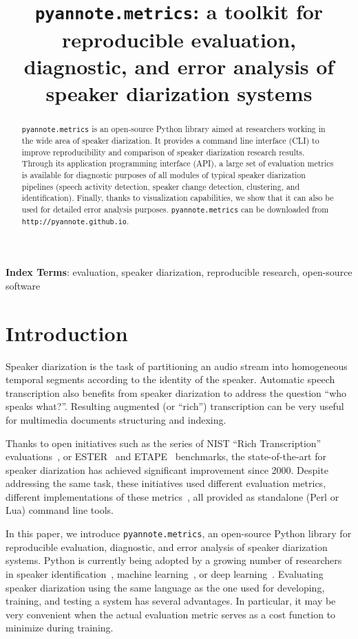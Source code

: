 \documentclass[a4paper]{article}
\title{\texttt{\Large{pyannote.metrics}}: a toolkit for reproducible evaluation,\\ diagnostic, and error analysis of speaker diarization systems}
\newcommand*\metrics{\texttt{\footnotesize{pyannote.metrics}}}
\newcommand*\github{\texttt{\footnotesize{http://pyannote.github.io}}}
\begin{document}
\maketitle
%
\begin{abstract}
\metrics{} is an open-source Python library aimed at researchers working in the wide area of speaker diarization.
It provides a command line interface (CLI) to improve reproducibility and comparison of speaker diarization research results. Through its application programming interface (API), a large set of evaluation metrics is available for diagnostic purposes of all modules of typical speaker diarization pipelines (speech activity detection, speaker change detection, clustering, and identification). Finally, thanks to visualization capabilities, we show that it can also be used for detailed error analysis purposes. \metrics{} can be downloaded from \github{}.
\end{abstract}
\noindent\textbf{Index Terms}: evaluation, speaker diarization, reproducible research, open-source software

\section{Introduction}

Speaker diarization is the task of partitioning an audio stream into homogeneous temporal segments according to the identity of the speaker.
Automatic speech transcription also benefits from speaker diarization to address the question ``who speaks what?''.
Resulting augmented (or ``rich'') transcription can be very useful for multimedia documents structuring and indexing.

Thanks to open initiatives such as the series of NIST ``Rich Transcription'' evaluations~\cite{Fiscus2006}, or ESTER~\cite{Galliano2005} and  ETAPE~\cite{Gravier2012} benchmarks, the state-of-the-art for speaker diarization has achieved significant improvement since 2000.
Despite addressing the same task, these initiatives used different evaluation metrics, different implementations of these metrics~\cite{NIST-RT03, Galibert2013}, all provided as standalone (Perl or Lua) command line tools.

In this paper, we introduce \metrics{}, an open-source Python library for reproducible evaluation, diagnostic, and error analysis of speaker diarization systems.
Python is currently being adopted by a growing number of researchers in speaker identification~\cite{sidekit, Bob2012}, machine learning~\cite{scikit-learn}, or deep learning~\cite{tensorflow2015-whitepaper}.
Evaluating speaker diarization using the same language as the one used for developing, training, and testing a system has several advantages.
In particular, it may be very convenient when the actual evaluation metric serves as a cost function to minimize during training.
\end{document}
